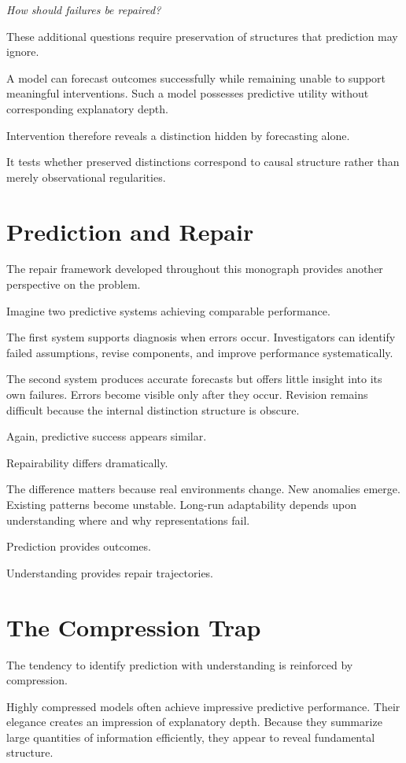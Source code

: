 \documentclass[11pt,oneside,openany]{book}
\begin{document}
\emph{How should failures be repaired?}

These additional questions require preservation of structures that prediction may ignore.

A model can forecast outcomes successfully while remaining unable to support meaningful interventions. Such a model possesses predictive utility without corresponding explanatory depth.

Intervention therefore reveals a distinction hidden by forecasting alone.

It tests whether preserved distinctions correspond to causal structure rather than merely observational regularities.

\section{Prediction and Repair}

The repair framework developed throughout this monograph provides another perspective on the problem.

Imagine two predictive systems achieving comparable performance.

The first system supports diagnosis when errors occur. Investigators can identify failed assumptions, revise components, and improve performance systematically.

The second system produces accurate forecasts but offers little insight into its own failures. Errors become visible only after they occur. Revision remains difficult because the internal distinction structure is obscure.

Again, predictive success appears similar.

Repairability differs dramatically.

The difference matters because real environments change. New anomalies emerge. Existing patterns become unstable. Long-run adaptability depends upon understanding where and why representations fail.

Prediction provides outcomes.

Understanding provides repair trajectories.

\section{The Compression Trap}

The tendency to identify prediction with understanding is reinforced by compression.

Highly compressed models often achieve impressive predictive performance. Their elegance creates an impression of explanatory depth. Because they summarize large quantities of information efficiently, they appear to reveal fundamental structure.
\end{document}
